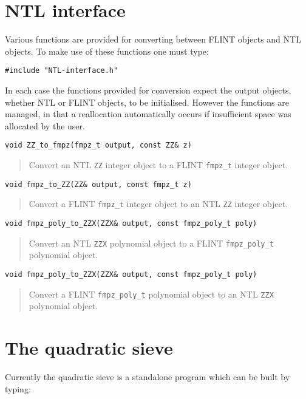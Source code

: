 \documentclass[a4paper,10pt]{article}
\newcommand{\code}{\lstinline}
\begin{document}
\section{NTL interface}
Various functions are provided for converting between FLINT objects and NTL objects. To make use of these functions one must type:

\code{#include "NTL-interface.h"}

In each case the functions provided for conversion expect the output objects, whether NTL or FLINT objects, to be initialised. However the functions are managed, in that a reallocation automatically occurs if insufficient space was allocated by the user.

\begin{lstlisting}
void ZZ_to_fmpz(fmpz_t output, const ZZ& z)
\end{lstlisting}
\begin{quote}
Convert an NTL \code{ZZ} integer object to a FLINT \code{fmpz_t} integer object.
\end{quote}

\begin{lstlisting}
void fmpz_to_ZZ(ZZ& output, const fmpz_t z)
\end{lstlisting}
\begin{quote}
Convert a FLINT \code{fmpz_t} integer object to an NTL \code{ZZ} integer object.
\end{quote}

\begin{lstlisting}
void fmpz_poly_to_ZZX(ZZX& output, const fmpz_poly_t poly)
\end{lstlisting}
\begin{quote}
Convert an NTL \code{ZZX} polynomial object to a FLINT \code{fmpz_poly_t} polynomial object.
\end{quote}

\begin{lstlisting}
void fmpz_poly_to_ZZX(ZZX& output, const fmpz_poly_t poly)
\end{lstlisting}
\begin{quote}
Convert a FLINT \code{fmpz_poly_t} polynomial object to an NTL \code{ZZX} polynomial object.
\end{quote}

\section{The quadratic sieve}
Currently the quadratic sieve is a standalone program which can be built by typing:
\end{document}
